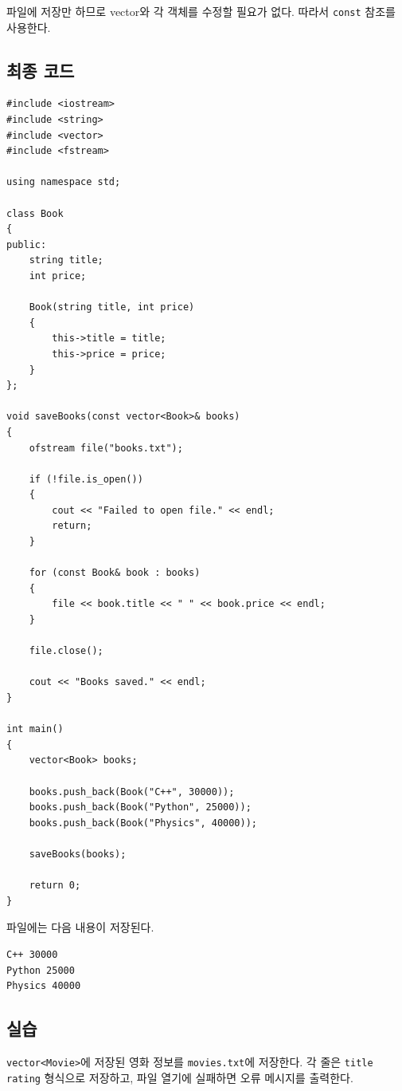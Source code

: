 \documentclass[11pt,a4paper]{article}
\begin{document}
파일에 저장만 하므로 vector와 각 객체를 수정할 필요가 없다.
따라서 \texttt{const} 참조를 사용한다.

\subsection{최종 코드}
\begin{lstlisting}
#include <iostream>
#include <string>
#include <vector>
#include <fstream>

using namespace std;

class Book
{
public:
    string title;
    int price;

    Book(string title, int price)
    {
        this->title = title;
        this->price = price;
    }
};

void saveBooks(const vector<Book>& books)
{
    ofstream file("books.txt");

    if (!file.is_open())
    {
        cout << "Failed to open file." << endl;
        return;
    }

    for (const Book& book : books)
    {
        file << book.title << " " << book.price << endl;
    }

    file.close();

    cout << "Books saved." << endl;
}

int main()
{
    vector<Book> books;

    books.push_back(Book("C++", 30000));
    books.push_back(Book("Python", 25000));
    books.push_back(Book("Physics", 40000));

    saveBooks(books);

    return 0;
}
\end{lstlisting}

파일에는 다음 내용이 저장된다.

\begin{verbatim}
C++ 30000
Python 25000
Physics 40000
\end{verbatim}

\subsection{실습}
\begin{practicebox}
\texttt{vector<Movie>}에 저장된 영화 정보를 \texttt{movies.txt}에 저장한다.
각 줄은 \texttt{title rating} 형식으로 저장하고, 파일 열기에 실패하면 오류 메시지를 출력한다.
\end{practicebox}
\end{document}
